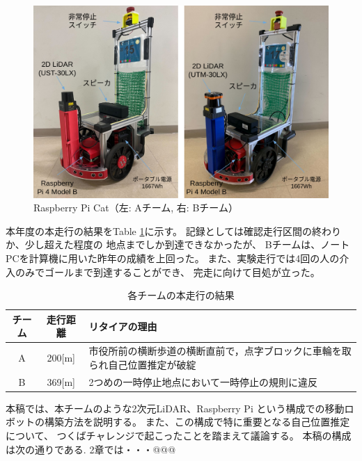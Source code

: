 \documentclass[twocolumn,9pt]{jsproceedings}
\begin{document}
\begin{figure}[h]
 	\begin{center}
 		\includegraphics[width=1.0\linewidth]{figs/raspicat.pdf}
 		\caption{Raspberry Pi Cat（左: Aチーム, 右: Bチーム）}
 		\label{fig:raspicat}
 	\end{center}
\end{figure}

本年度の本走行の結果をTable \ref{MainRun}に示す。
記録としては確認走行区間の終わりか、少し超えた程度の
地点までしか到達できなかったが、
Bチームは、ノートPCを計算機に用いた昨年の成績を上回った。
また、実験走行では4回の人の介入のみでゴールまで到達することができ、
完走に向けて目処が立った。

\begin{table}[h]
  \caption{各チームの本走行の結果}
  \label{MainRun}
	\begin{tabular}{|c|c|p{5.4cm}|}
    \hline
	チーム & 走行距離 & リタイアの理由 \\
    \hline
	A & 200[m] & 市役所前の横断歩道の横断直前で，点字ブロックに車輪を取られ自己位置推定が破綻\\
    \hline
	B & 369[m] & 2つめの一時停止地点において一時停止の規則に違反 \\ 
    \hline
  \end{tabular}
\end{table}


本稿では、本チームのような2次元LiDAR、Raspberry Pi
という構成での移動ロボットの構築方法を説明する。
また、この構成で特に重要となる自己位置推定について、
つくばチャレンジで起こったことを踏まえて議論する。
本稿の構成は次の通りである. 
2章では・・・@@@
\end{document}
